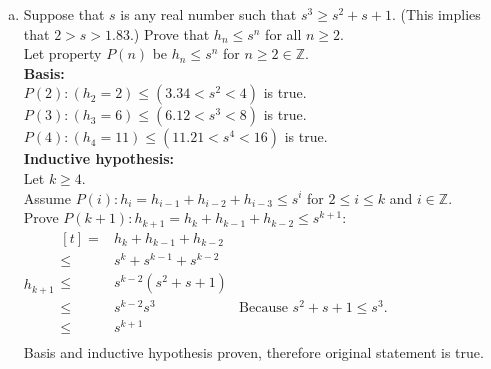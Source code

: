 \documentclass[letterpaper,fleqn,leqno]{article}
\begin{document}
\begin{enumerate}[(a)]
{\begin{enumerate}[(a)]
				\item
				Suppose that $s$ is any real number such that $s^3\geq s^2+s+1$. (This implies that $2>s>1.83$.) Prove that $h_n\leq s^n$ for all $n\geq2$. \\
				Let property $P(n)$ be $h_n\leq s^n$ for $n\geq2\in\mathbb{Z}$. \\
				\textbf{Basis:} \\
				$P(2): (h_2=2)\leq(3.34<s^2<4)$ is true. \\
				$P(3): (h_3=6)\leq(6.12<s^3<8)$ is true. \\
				$P(4): (h_4=11)\leq(11.21<s^4<16)$ is true. \\
				\textbf{Inductive hypothesis:} \\
				Let $k\geq4$. \\
				Assume $P(i): h_i=h_{i-1}+h_{i-2}+h_{i-3}\leq s^i$ for $2\leq i\leq k$ and $i\in\mathbb{Z}$. \\
				Prove $P(k+1): h_{k+1}=h_k+h_{k-1}+h_{k-2}\leq s^{k+1}$: \\
				$h_{k+1}\begin{aligned}[t]
					= & h_k+h_{k-1}+h_{k-2} \\
					\leq & s^k+s^{k-1}+s^{k-2} \\
					\leq & s^{k-2}\left(s^2+s+1\right) \\
					\leq & s^{k-2}s^3 & \text{Because $s^2+s+1\leq s^3$.} \\
					\leq & s^{k+1} \\
				\end{aligned}$ \\
				Basis and inductive hypothesis proven, therefore original statement is true. \\
			\end{enumerate}
		}
\end{enumerate}
\end{document}
